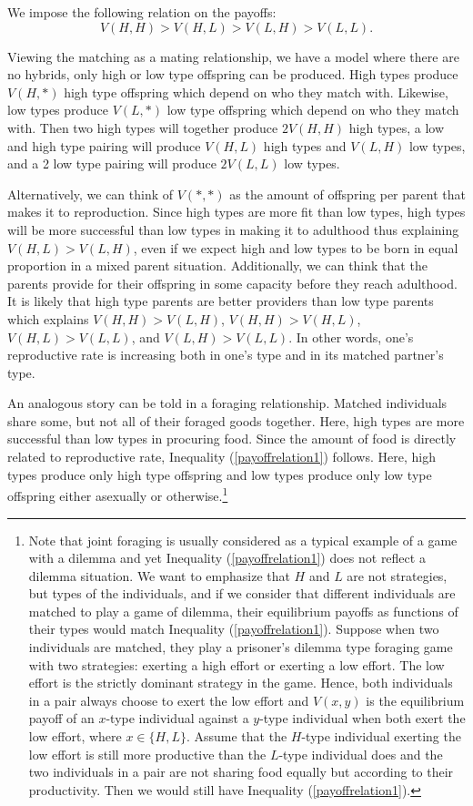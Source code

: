 We impose the following relation on the payoffs: 
\begin{equation}\label{payoffrelation1}
 V(H,H)>V(H,L)>V(L,H)>V(L,L).
 \end{equation}

Viewing the matching as a mating relationship, we have a model where there are no hybrids, only high or low type offspring can be produced. High types produce $V(H,*)$ high type offspring which depend on who they match with. Likewise, low types produce $V(L,*)$ low type offspring which depend on who they match with. Then two high types will together produce $2V(H,H)$ high types, a low and high type pairing will produce $V(H,L)$ high types and $V(L,H)$ low types, and a 2 low type pairing will produce $2V(L,L)$ low types.

Alternatively, we can think of $V(*,*)$ as the amount of offspring per parent that makes it to reproduction. Since high types are more fit than low types, high types will be more successful than low types in making it to adulthood thus explaining $V(H,L) > V(L,H)$, even if we expect high and low types to be born in equal proportion in a mixed parent situation. Additionally, we can think that the parents provide for their offspring in some capacity before they reach adulthood. It is likely that high type parents are better providers than low type parents which explains $V(H,H) > V(L, H)$, $V(H, H)>V(H, L)$, $V(H, L)>V(L, L)$, and $V(L,H) > V(L,L)$. In other words, one's reproductive rate is increasing both in one's type and in its matched partner's type. 

An analogous story can be told in a foraging relationship. Matched individuals share some, but not all of their foraged goods together. Here, high types are more successful than low types in procuring food. Since the amount of food is directly related to reproductive rate, Inequality (\ref{payoffrelation1}) follows. Here, high types produce only high type offspring and low types produce only low type offspring either asexually or otherwise.\footnote{Note that joint foraging is usually considered as a typical example of a game with a dilemma and yet Inequality (\ref{payoffrelation1}) does not reflect a dilemma situation. We want to emphasize that $H$ and $L$ are not strategies, but types of the individuals, and if we consider that different individuals are matched to play a game of dilemma, their equilibrium payoffs as functions of their types would match Inequality (\ref{payoffrelation1}). Suppose when two individuals are matched, they play a prisoner's dilemma type foraging game with two strategies: exerting a high effort or exerting a low effort. The low effort is the strictly dominant strategy in the game. Hence, both individuals in a pair always choose to exert the low effort and $V(x,y)$ is the equilibrium payoff of an $x$-type individual against a $y$-type individual when both exert the low effort, where $x\in\{H,L\}$. Assume that the $H$-type individual exerting the low effort is still more productive than the $L$-type individual does and the two individuals in a pair are not sharing food equally but according to their productivity. Then we would still have Inequality (\ref{payoffrelation1}).}

